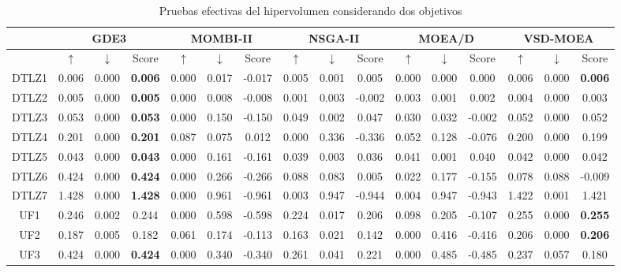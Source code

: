 \begin{table}[H]
\centering
\caption{Pruebas efectivas del hipervolumen considerando dos objetivos}
\label{tab:Effective_Test_2obj_exp}
\resizebox{\textwidth}{!}
{%
\begin{tabular}{|c|c|c|c|c|c|c|c|c|c|c|c|c|c|c|c|}
\hline
 & \multicolumn{3}{c|}{GDE3} & \multicolumn{3}{c|}{MOMBI-II} & \multicolumn{3}{c|}{NSGA-II} & \multicolumn{3}{c|}{MOEA/D} & \multicolumn{3}{c|}{VSD-MOEA} \\ \hline
 & $\uparrow$ & $\downarrow$ & Score & $\uparrow$ & $\downarrow$ & Score & $\uparrow$ & $\downarrow$ & Score & $\uparrow$ & $\downarrow$ & Score & $\uparrow$ & $\downarrow$ & Score \\ \hline
DTLZ1 & 0.006 & 0.000 & \textbf{0.006} & 0.000 & 0.017 & -0.017 & 0.005 & 0.001 & 0.005 & 0.000 & 0.000 & 0.000 & 0.006 & 0.000 & \textbf{0.006} \\ \hline
DTLZ2 & 0.005 & 0.000 & \textbf{0.005} & 0.000 & 0.008 & -0.008 & 0.001 & 0.003 & -0.002 & 0.003 & 0.001 & 0.002 & 0.004 & 0.000 & 0.003 \\ \hline
DTLZ3 & 0.053 & 0.000 & \textbf{0.053} & 0.000 & 0.150 & -0.150 & 0.049 & 0.002 & 0.047 & 0.030 & 0.032 & -0.002 & 0.052 & 0.000 & 0.052 \\ \hline
DTLZ4 & 0.201 & 0.000 & \textbf{0.201} & 0.087 & 0.075 & 0.012 & 0.000 & 0.336 & -0.336 & 0.052 & 0.128 & -0.076 & 0.200 & 0.000 & 0.199 \\ \hline
DTLZ5 & 0.043 & 0.000 & \textbf{0.043} & 0.000 & 0.161 & -0.161 & 0.039 & 0.003 & 0.036 & 0.041 & 0.001 & 0.040 & 0.042 & 0.000 & 0.042 \\ \hline
DTLZ6 & 0.424 & 0.000 & \textbf{0.424} & 0.000 & 0.266 & -0.266 & 0.088 & 0.083 & 0.005 & 0.022 & 0.177 & -0.155 & 0.078 & 0.088 & -0.009 \\ \hline
DTLZ7 & 1.428 & 0.000 & \textbf{1.428} & 0.000 & 0.961 & -0.961 & 0.003 & 0.947 & -0.944 & 0.004 & 0.947 & -0.943 & 1.422 & 0.001 & 1.421 \\ \hline
UF1 & 0.246 & 0.002 & 0.244 & 0.000 & 0.598 & -0.598 & 0.224 & 0.017 & 0.206 & 0.098 & 0.205 & -0.107 & 0.255 & 0.000 & \textbf{0.255} \\ \hline
UF2 & 0.187 & 0.005 & 0.182 & 0.061 & 0.174 & -0.113 & 0.163 & 0.021 & 0.142 & 0.000 & 0.416 & -0.416 & 0.206 & 0.000 & \textbf{0.206} \\ \hline
UF3 & 0.424 & 0.000 & \textbf{0.424} & 0.000 & 0.340 & -0.340 & 0.261 & 0.041 & 0.221 & 0.000 & 0.485 & -0.485 & 0.237 & 0.057 & 0.180 \\ \hline

\end{tabular}}
\end{table}
